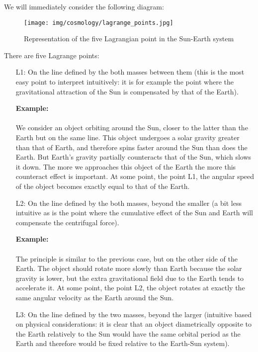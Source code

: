 	We will immediately consider the following diagram:
	\begin{figure}[H]
		\centering
		\texttt{[image: img/cosmology/lagrange\_points.jpg]}
		\caption[]{Representation of the five Lagrangian point in the Sun-Earth system}	
	\end{figure}
	There are five Lagrange points:
	\begin{enumerate}
		\item[L1:] On the line defined by the both masses between them (this is the most easy point to interpret intuitively: it is for example the point where the gravitational attraction of the Sun is compensated by that of the Earth).

		\begin{tcolorbox}[colframe=black,colback=white,sharp corners]
		\textbf{{\Large {}}Example:}\\\\
		We consider an object orbiting around the Sun, closer to the latter than the Earth but on the same line. This object undergoes a solar gravity greater than that of Earth, and therefore spins faster around the Sun than does the Earth. But Earth's gravity partially counteracts that of the Sun, which slows it down. The more we approaches this object of the Earth the more this counteract effect is important. At some point, the point L1, the angular speed of the object becomes exactly equal to that of the Earth.
		\end{tcolorbox}
		

		\item[L2:] On the line defined by the both masses, beyond the smaller (a bit less intuitive as is the point where the cumulative effect of the Sun and Earth will compensate the centrifugal force).

		\begin{tcolorbox}[colframe=black,colback=white,sharp corners]
		\textbf{{\Large {}}Example:}\\\\
		The principle is similar to the previous case, but on the other side of the Earth. The object should rotate more slowly than Earth because the solar gravity is lower, but the extra gravitational field due to the Earth tends to accelerate it. At some point, the point L2, the object rotates at exactly the same angular velocity as the Earth around the Sun.
		\end{tcolorbox}
		
		\item[L3:] On the line defined by the two masses, beyond the larger (intuitive based on physical considerations: it is clear that an object diametrically opposite to the Earth relatively to the Sun would have the same orbital period as the Earth and therefore would be fixed relative to the Earth-Sun system).


\end{enumerate}
